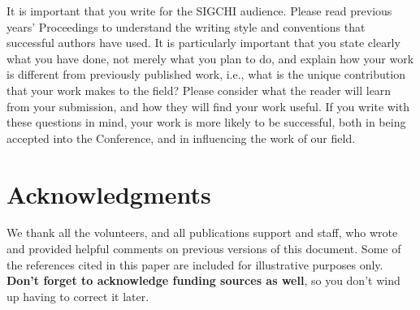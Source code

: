 \documentclass{sigchi}
\begin{document}
It is important that you write for the SIGCHI audience.  Please read
previous years' Proceedings to understand the writing style and
conventions that successful authors have used.  It is particularly
important that you state clearly what you have done, not merely what
you plan to do, and explain how your work is different from previously
published work, i.e., what is the unique contribution that your work
makes to the field?  Please consider what the reader will learn from
your submission, and how they will find your work useful.  If you
write with these questions in mind, your work is more likely to be
successful, both in being accepted into the Conference, and in
influencing the work of our field.

\section{Acknowledgments}

We thank all the volunteers, and all publications support
and staff, who wrote and provided helpful comments on previous
versions of this document.  Some of the references cited in this paper
are included for illustrative purposes only.  \textbf{Don't forget
to acknowledge funding sources as well}, so you don't wind up
having to correct it later.

%
%
%
%
%
\balance



\end{document}
